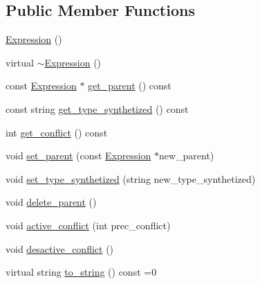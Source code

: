 \subsection*{Public Member Functions}
\begin{DoxyCompactItemize}
\item 
\hyperlink{classgenevalmag_1_1Expression_a249f080918dd3203c7dfc8e9e691bc50}{Expression} ()
\item 
virtual \hyperlink{classgenevalmag_1_1Expression_a9ab15992e6a819e8e683745069bcf15b}{$\sim$Expression} ()
\item 
const \hyperlink{classgenevalmag_1_1Expression}{Expression} $\ast$ \hyperlink{classgenevalmag_1_1Expression_a21b78e4077b2c9d41076f8c798996f34}{get\_\-parent} () const 
\item 
const string \hyperlink{classgenevalmag_1_1Expression_a70ea402fd43f8c588c83196bc4a10183}{get\_\-type\_\-synthetized} () const 
\item 
int \hyperlink{classgenevalmag_1_1Expression_afeaeebdfea5e8422299d152f8334034a}{get\_\-conflict} () const 
\item 
void \hyperlink{classgenevalmag_1_1Expression_acba3103fd864eacfefdecb88e597de1f}{set\_\-parent} (const \hyperlink{classgenevalmag_1_1Expression}{Expression} $\ast$new\_\-parent)
\item 
void \hyperlink{classgenevalmag_1_1Expression_a22920a0309ce122eb22553898ec0108f}{set\_\-type\_\-synthetized} (string new\_\-type\_\-synthetized)
\item 
void \hyperlink{classgenevalmag_1_1Expression_abfc415a5ddd5ae05b1e9610a2f347203}{delete\_\-parent} ()
\item 
void \hyperlink{classgenevalmag_1_1Expression_a6c1265f335e85346c23556cc361c4aad}{active\_\-conflict} (int prec\_\-conflict)
\item 
void \hyperlink{classgenevalmag_1_1Expression_aa851daf99e3e04b3cf2bb2c7d53811f8}{desactive\_\-conflict} ()
\item 
virtual string \hyperlink{classgenevalmag_1_1Expression_a8685f44429501da942b1fe76880af6fe}{to\_\-string} () const =0
\end{DoxyCompactItemize}
